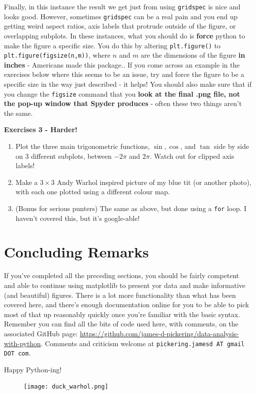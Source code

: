 \documentclass[10pt,a4paper]{memoir}
\begin{document}
Finally, in this instance the result we get just from using \texttt{gridspec} is nice and looks good. However, sometimes \texttt{gridspec} can be a real pain and you end up getting weird aspect ratios, axis labels that protrude outside of the figure, or overlapping subplots. In these instances, what you should do is \textbf{force} python to make the figure a specific size. You do this by altering \texttt{plt.figure()} to \texttt{plt.figure(figsize(n,m))}, where $n$ and $m$ are the dimensions of the figure \textbf{in inches} - Americans made this package.. If you come across an example in the exercises below where this seems to be an issue, try and force the figure to be a specific size in the way just described - it helps! You should also make sure that if you change the \texttt{figsize} command that you \textbf{look at the final .png file, not the pop-up window that Spyder produces} - often these two things aren't the same.  

\noindent \textbf{Exercises 3 - Harder!}
\begin{enumerate}
	\item Plot the three main trigonometric functions, $\sin, \cos$, and $\tan$ side by side on 3 different subplots, between $-2\pi$ and $2\pi$. Watch out for clipped axis labels! 
	\item Make a $3\times 3$ Andy Warhol inspired picture of my blue tit (or another photo), with each one plotted using a different colour map. 
	\item (Bonus for serious punters) The same as above, but done using a \texttt{for} loop. I haven't covered this, but it's google-able!
\end{enumerate}
\newpage
\section{Concluding Remarks}
If you've completed all the preceding sections, you should be fairly competent and able to continue using matplotlib to present yor data and make informative (and beautiful) figures. There is a lot more functionality than what has been covered here, and there's enough documentation online for you to be able to pick most of that up reasonably quickly once you're familiar with the basic syntax. Remember you can find all the bits of code used here, with comments, on the associated GitHub page: \url{https://github.com/james-d-pickering/data-analysis-with-python}. Comments and criticism welcome at \texttt{pickering.jamesd AT gmail DOT com}.

Happy Python-ing!

\begin{figure}[h!]
	\centering
	\texttt{[image: duck\_warhol.png]}
\end{figure}
\end{document}
